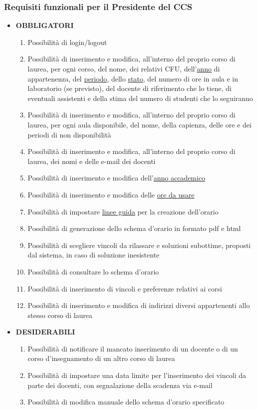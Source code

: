 \documentclass[11pt,a4paper]{article}
\begin{document}
\subsubsection{Requisiti funzionali per il Presidente del CCS}
\begin{itemize}
\item \textbf{OBBLIGATORI}
\begin{enumerate}
\item Possibilità di login/logout
\item Possibilità di inserimento e modifica, all'interno del proprio corso di laurea, per ogni corso, del nome, dei relativi CFU, dell'\underline{anno} di appartenenza, del \underline{periodo}, dello \underline{stato}, del numero di ore in aula e in laboratorio (se previsto), del docente di riferimento che lo tiene, di eventuali assistenti e della stima del numero di studenti che lo seguiranno
\item Possibilità di inserimento e modifica, all'interno del proprio corso di laurea, per ogni aula disponibile, del nome, della capienza, delle ore e dei periodi di non disponibilità
\item Possibilità di inserimento e modifica, all'interno del proprio corso di laurea, dei nomi e delle e-mail dei docenti
\item Possibilità di inserimento e modifica dell'\underline{anno accademico}
\item Possibilità di inserimento e modifica delle \underline{ore da usare}
\item Possibilità di impostare \underline{linee guida} per la creazione dell'orario
\item Possibilità di generazione dello schema d'orario in formato pdf e html
\item Possibilità di scegliere vincoli da rilassare e soluzioni subottime, proposti dal sistema, in caso di soluzione inesistente
\item Possibilità di consultare lo schema d'orario
\item Possibilità di inserimento di vincoli e preferenze relativi ai corsi
\item Possibilità di inserimento e modifica di indirizzi diversi appartenenti allo stesso corso di laurea
\end{enumerate}
\item \textbf{DESIDERABILI}
\begin{enumerate}
\item Possibilità di notificare il mancato inserimento di un docente o di un corso d'insegnamento di un altro corso di laurea
\item Possibilità di impostare una data limite per l'inserimento dei vincoli da parte dei docenti, con segnalazione della scadenza via e-mail
\item Possibilità di modifica manuale dello schema d'orario specificato
\end{enumerate}
\end{itemize}
\end{document}
